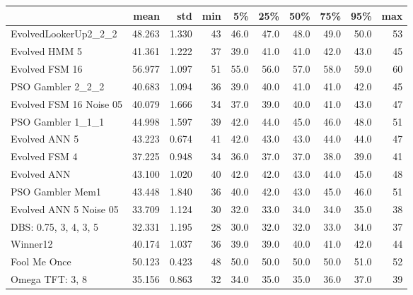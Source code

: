 \begin{tabular}{lrrrrrrrrr}
\toprule
{} &    mean &    std &  min &    5\% &   25\% &   50\% &   75\% &   95\% &  max \\
\midrule
EvolvedLookerUp2\_2\_2    &  48.263 &  1.330 &   43 &  46.0 &  47.0 &  48.0 &  49.0 &  50.0 &   53 \\
Evolved HMM 5           &  41.361 &  1.222 &   37 &  39.0 &  41.0 &  41.0 &  42.0 &  43.0 &   45 \\
Evolved FSM 16          &  56.977 &  1.097 &   51 &  55.0 &  56.0 &  57.0 &  58.0 &  59.0 &   60 \\
PSO Gambler 2\_2\_2       &  40.683 &  1.094 &   36 &  39.0 &  40.0 &  41.0 &  41.0 &  42.0 &   45 \\
Evolved FSM 16 Noise 05 &  40.079 &  1.666 &   34 &  37.0 &  39.0 &  40.0 &  41.0 &  43.0 &   47 \\
PSO Gambler 1\_1\_1       &  44.998 &  1.597 &   39 &  42.0 &  44.0 &  45.0 &  46.0 &  48.0 &   51 \\
Evolved ANN 5           &  43.223 &  0.674 &   41 &  42.0 &  43.0 &  43.0 &  44.0 &  44.0 &   47 \\
Evolved FSM 4           &  37.225 &  0.948 &   34 &  36.0 &  37.0 &  37.0 &  38.0 &  39.0 &   41 \\
Evolved ANN             &  43.100 &  1.020 &   40 &  42.0 &  42.0 &  43.0 &  44.0 &  45.0 &   48 \\
PSO Gambler Mem1        &  43.448 &  1.840 &   36 &  40.0 &  42.0 &  43.0 &  45.0 &  46.0 &   51 \\
Evolved ANN 5 Noise 05  &  33.709 &  1.124 &   30 &  32.0 &  33.0 &  34.0 &  34.0 &  35.0 &   38 \\
DBS: 0.75, 3, 4, 3, 5   &  32.331 &  1.195 &   28 &  30.0 &  32.0 &  32.0 &  33.0 &  34.0 &   37 \\
Winner12                &  40.174 &  1.037 &   36 &  39.0 &  39.0 &  40.0 &  41.0 &  42.0 &   44 \\
Fool Me Once            &  50.123 &  0.423 &   48 &  50.0 &  50.0 &  50.0 &  50.0 &  51.0 &   52 \\
Omega TFT: 3, 8         &  35.156 &  0.863 &   32 &  34.0 &  35.0 &  35.0 &  36.0 &  37.0 &   39 \\
\bottomrule
\end{tabular}
